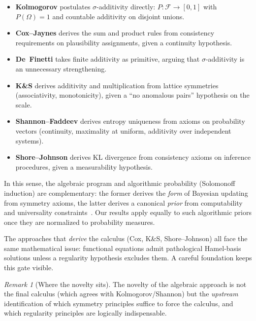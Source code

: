 \documentclass[11pt]{article}
\theoremstyle{definition}
\theoremstyle{remark}
\newtheorem{remark}[theorem]{Remark}
\begin{document}
\begin{itemize}
\item \textbf{Kolmogorov} postulates $\sigma$-additivity directly: $P:\mathcal{F}\to[0,1]$
  with $P(\Omega)=1$ and countable additivity on disjoint unions. \cite{Kolmogorov1933}

\item \textbf{Cox--Jaynes} derives the sum and product rules from consistency requirements on
  plausibility assignments, given a continuity hypothesis. \cite{Cox1946}

\item \textbf{De~Finetti} takes finite additivity as primitive, arguing that $\sigma$-additivity
  is an unnecessary strengthening. \cite{deFinetti1974}

\item \textbf{K\&S} derives additivity and multiplication from lattice symmetries (associativity,
  monotonicity), given a ``no anomalous pairs'' hypothesis on the scale.

\item \textbf{Shannon--Faddeev} derives entropy uniqueness from axioms on probability vectors
  (continuity, maximality at uniform, additivity over independent systems).
  \cite{Shannon1948,Faddeev1956}

\item \textbf{Shore--Johnson} derives KL divergence from consistency axioms on inference
  procedures, given a measurability hypothesis. \cite{ShoreJohnson1980}
\end{itemize}

In this sense, the algebraic program and algorithmic probability (Solomonoff induction) are complementary:
the former derives the \emph{form} of Bayesian updating from symmetry axioms, the latter derives a
canonical \emph{prior} from computability and universality constraints~\cite{Solomonoff1964,Hutter2005}.
Our results apply equally to such algorithmic priors once they are normalized to probability measures.

The approaches that \emph{derive} the calculus (Cox, K\&S, Shore--Johnson) all face the same
mathematical issue: functional equations admit pathological Hamel-basis solutions unless a
regularity hypothesis excludes them.  A careful foundation keeps this gate visible.

\begin{remark}[Where the novelty sits]
The novelty of the algebraic approach is not the final calculus (which agrees with
Kolmogorov/Shannon) but the \emph{upstream} identification of which symmetry principles
suffice to force the calculus, and which regularity principles are logically indispensable.
\end{remark}
\end{document}
